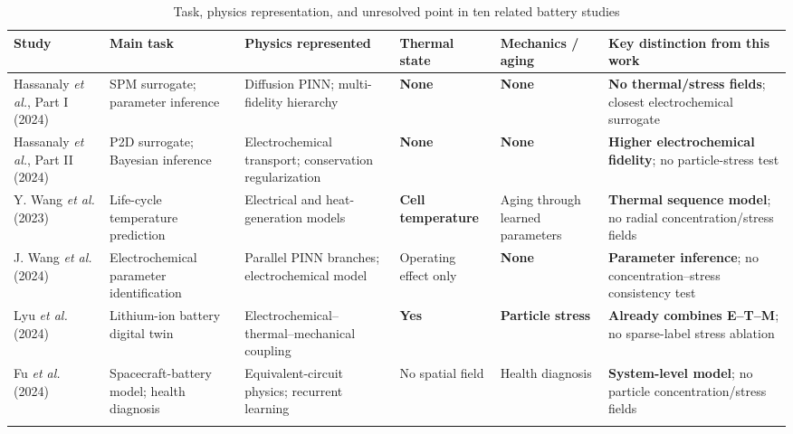 \documentclass[conference]{IEEEtran}
\begin{document}
\begin{table}[t]
\centering
\caption{Task, physics representation, and unresolved point in ten related battery studies}
\label{tab:gap}
\scriptsize
\renewcommand{\arraystretch}{1.08}
\setlength{\tabcolsep}{2.5pt}
\begin{tabular}{>{\raggedright\arraybackslash}p{2.55cm}>{\raggedright\arraybackslash}p{2.55cm}>{\raggedright\arraybackslash}p{3.0cm}>{\raggedright\arraybackslash}p{1.65cm}>{\raggedright\arraybackslash}p{2.35cm}>{\raggedright\arraybackslash}p{3.7cm}}
\toprule
Study & Main task & Physics represented & Thermal state & Mechanics / aging & Key distinction from this work \\
\midrule
Hassanaly \emph{et al.}, Part I (2024) \cite{hassanaly2024part1} & SPM surrogate; parameter inference & Diffusion PINN; multi-fidelity hierarchy & \textbf{None} & \textbf{None} & \textbf{No thermal/stress fields}; closest electrochemical surrogate \\
\addlinespace[1pt]
Hassanaly \emph{et al.}, Part II (2024) \cite{hassanaly2024part2} & P2D surrogate; Bayesian inference & Electrochemical transport; conservation regularization & \textbf{None} & \textbf{None} & \textbf{Higher electrochemical fidelity}; no particle-stress test \\
\addlinespace[1pt]
Y. Wang \emph{et al.} (2023) \cite{wang2023temperature} & Life-cycle temperature prediction & Electrical and heat-generation models & \textbf{Cell temperature} & Aging through learned parameters & \textbf{Thermal sequence model}; no radial concentration/stress fields \\
\addlinespace[1pt]
J. Wang \emph{et al.} (2024) \cite{wang2024parameter} & Electrochemical parameter identification & Parallel PINN branches; electrochemical model & Operating effect only & \textbf{None} & \textbf{Parameter inference}; no concentration--stress consistency test \\
\addlinespace[1pt]
Lyu \emph{et al.} (2024) \cite{lyu2024digitaltwin} & Lithium-ion battery digital twin & Electrochemical--thermal--mechanical coupling & \textbf{Yes} & \textbf{Particle stress} & \textbf{Already combines E--T--M}; no sparse-label stress ablation \\
\addlinespace[1pt]
Fu \emph{et al.} (2024) \cite{fu2024spacecraft} & Spacecraft-battery model; health diagnosis & Equivalent-circuit physics; recurrent learning & No spatial field & Health diagnosis & \textbf{System-level model}; no particle concentration/stress fields \\
\addlinespace[1pt]

\end{tabular}
\end{table}
\end{document}
